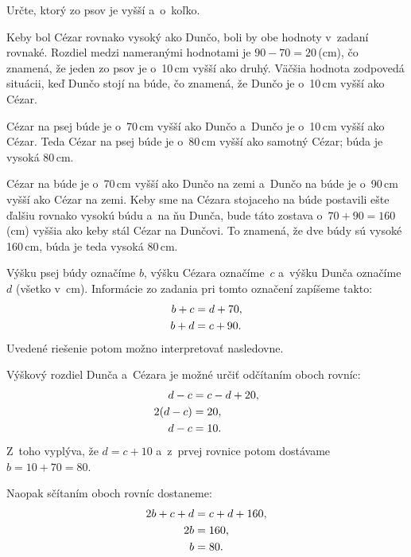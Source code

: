 {%
\napad
Určte, ktorý zo psov je vyšší a~o~koľko.

\riesenie
Keby bol Cézar rovnako vysoký ako Dunčo, boli by obe hodnoty v~zadaní
rovnaké. Rozdiel medzi nameranými hodnotami je $90-70=20$\,(cm), čo
znamená, že jeden zo psov je o~10\,cm vyšší ako druhý. Väčšia hodnota
zodpovedá situácii, keď Dunčo stojí na búde, čo znamená, že Dunčo je
o~10\,cm vyšší ako Cézar.

Cézar na psej búde je o~70\,cm vyšší ako Dunčo a~Dunčo je o~10\,cm
vyšší ako Cézar. Teda Cézar na psej búde je o~80\,cm vyšší ako samotný
Cézar; búda je vysoká 80\,cm.
%

\ineriesenie
Cézar na búde je o~70\,cm vyšší ako Dunčo na zemi a~Dunčo na búde je o~90\,cm vyšší ako Cézar na zemi.
Keby sme na Cézara stojaceho na búde postavili ešte ďalšiu rovnako vysokú
búdu a~na ňu Dunča, bude táto zostava o~$70+90=160$\,(cm) vyššia ako keby
stál Cézar na Dunčovi.
To znamená, že dve búdy sú vysoké 160\,cm, búda je teda vysoká 80\,cm.

\poznamka
Výšku psej búdy označíme $b$, výšku Cézara označíme~$c$ a~výšku Dunča
označíme~$d$ (všetko v~cm).
Informácie zo zadania pri tomto označení zapíšeme takto:
$$
\aligned
b+c&=d+70,\\
b+d&=c+90.
\endaligned
$$
Uvedené riešenie potom možno interpretovať nasledovne.

Výškový rozdiel Dunča a~Cézara je možné určiť odčítaním oboch rovníc:
$$
\aligned
d-c&=c-d+20,\\
2(d-c)&=20,\\
d-c&=10.
\endaligned
$$
Z~toho vyplýva, že $d=c+10$ a~z~prvej rovnice potom dostávame
$b=10+70=80$.

Naopak sčítaním oboch rovníc dostaneme:
$$
\aligned
2b+c+d&=c+d+160,\\
2b&=160,\\
b&=80.
\endaligned
$$
}

